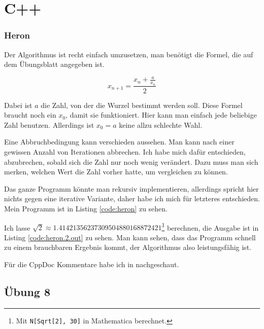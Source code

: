 
\part{C++}

\section{Heron}

Der Algorithmus ist recht einfach umzusetzen, man benötigt die Formel, die auf dem Übungsblatt angegeben ist.

\begin{equation}
x_{n+1}=\frac{x_n+\frac{a}{x_n}}{2}
\end{equation}

Dabei ist $a$ die Zahl, von der die Wurzel bestimmt werden soll. Diese Formel braucht noch ein $x_0$, damit sie funktioniert. Hier kann man einfach jede beliebige Zahl benutzen. Allerdings ist $x_0=a$ keine allzu schlechte Wahl.

Eine Abbruchbedingung kann verschieden aussehen. Man kann nach einer gewissen Anzahl von Iterationen abbrechen. Ich habe mich dafür entschieden, abzubrechen, sobald sich die Zahl nur noch wenig verändert. Dazu muss man sich merken, welchen Wert die Zahl vorher hatte, um vergleichen zu können.

Das ganze Programm könnte man rekursiv implementieren, allerdings spricht hier nichts gegen eine iterative Variante, daher habe ich mich für letzteres entschieden. Mein Programm ist in Listing \ref{code:heron} zu sehen.


Ich lasse $\sqrt{2} \approx 1.41421356237309504880168872421$\footnote{Mit \texttt{N[Sqrt[2], 30]} in Mathematica berechnet.} berechnen, die Ausgabe ist in Listing \ref{code:heron.2.out} zu sehen. Man kann sehen, dass das Programm schnell zu einem brauchbaren Ergebnis kommt, der Algorithmus also leistungsfähig ist.


Für die CppDoc Kommentare habe ich in \cite{cppdoc} nachgeschaut.

\chapter{Übung 8}

